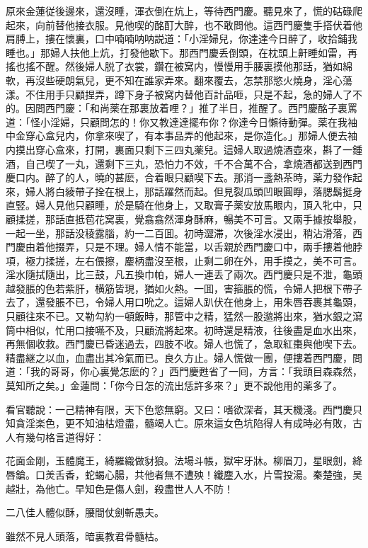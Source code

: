 原來金蓮従後邊來，還沒睡，渾衣倒在炕上，等待西門慶。聽見來了，慌的𥑮碌爬起來，向前替他接衣服。見他喫的酩酊大醉，也不敢問他。這西門慶隻手搭伏着他肩膊上，摟在懷裏，口中喃喃呐呐説道：「小淫婦兒，你達達今日醉了，收拾鋪我睡也。」那婦人扶他上炕，打發他歇下。那西門慶丢倒頭，在枕頭上鼾睡如雷，再搖也搖不醒。然後婦人脱了衣裳，鑽在被窝内，慢慢用手腰裏摸他那話，猶如綿軟，再沒些硬朗氣兒，更不知在誰家弄來。翻來覆去，怎禁那慾火燒身，淫心蕩漾。不住用手只顧捏弄，蹲下身子被窝内替他百計品咂，只是不起，急的婦人了不的。因問西門慶：「和尚薬在那裏放着哩？」推了半日，推醒了。西門慶酩子裏罵道：「怪小淫婦，只顧問怎的！你又教達達擺布你？你達今日懶待動彈。薬在我袖中金穿心盒兒内，你拿來喫了，有本事品弄的他起來，是你造化。」那婦人便去袖内摸出穿心盒來，打開，裏面只剩下三四丸薬兒。這婦人取過燒酒壺來，斟了一鍾酒，自己喫了一丸，還剩下三丸，恐怕力不效，千不合萬不合，拿燒酒都送到西門慶口内。醉了的人，曉的甚麽，合着眼只顧喫下去。那消一盞熱茶時，薬力發作起來，婦人將白綾帶子拴在根上，那話躍然而起。但見裂瓜頭凹眼圓睜，落腮鬍挺身直竪。婦人見他只顧睡，於是騎在他身上，又取膏子薬安放馬眼内，頂入牝中，只顧揉搓，那話直抵苞花窝裏，覺翕翕然渾身酥麻，暢美不可言。又兩手據按舉股，一起一坐，那話没稜露腦，約一二百囬。初時澀滞，次後淫水浸出，稍沾滑落，西門慶由着他掇弄，只是不理。婦人情不能當，以舌親於西門慶口中，兩手摟着他脖項，極力揉搓，左右偎擦，麈柄盡沒至根，止剩二卵在外，用手摸之，美不可言。淫水隨拭隨出，比三鼓，凡五換巾帕，婦人一連丢了兩次。西門慶只是不泄，龜頭越發脹的色若紫肝，横筋皆現，猶如火熱。一囬，害箍脹的慌，令婦人把根下帶子去了，還發脹不已，令婦人用口吮之。這婦人趴伏在他身上，用朱唇吞裹其龜頭，只顧往來不已。又勒勾約一頓飯時，那管中之精，猛然一股邈將出來，猶水銀之瀉筒中相似，忙用口接嚥不及，只顧流將起來。初時還是精液，往後盡是血水出來，再無個收救。西門慶已昏迷過去，四肢不收。婦人也慌了，急取紅棗與他喫下去。精盡継之以血，血盡出其冷氣而已。良久方止。婦人慌做一團，便摟着西門慶，問道：「我的哥哥，你心裏覺怎麽的？」西門慶甦省了一囘，方言：「我頭目森森然，莫知所之矣。」金蓮問：「你今日怎的流出恁許多來？」更不說他用的薬多了。

看官聽說：一己精神有限，天下色慾無窮。又曰：嗜欲深者，其天機淺。西門慶只知貪淫楽色，更不知油枯燈盡，髓竭人亡。原來這女色坑陷得人有成時必有敗，古人有幾句格言道得好：

\begin{myquote}
花面金剛，玉體魔王，綺羅織做豺狼。法場斗帳，獄牢牙牀。柳眉刀，星眼劍，絳唇鎗。口羙舌香，蛇蝎心腸，共他者無不遭殃！纖塵入水，片雪投湯。秦楚強，吴越壯，為他亡。早知色是傷人劍，殺盡世人人不防！

二八佳人體似酥，腰間仗劍斬愚夫。

雖然不見人頭落，暗裏教君骨髓枯。
\end{myquote}

